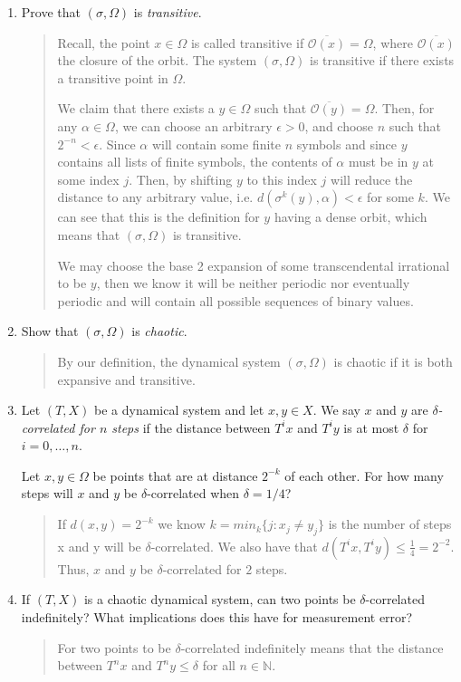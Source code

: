 \documentclass[letter]{article}
\newcommand{\N}{\mathbb{N}}
\begin{document}
\begin{enumerate}
\begin{enumerate}
			\item Prove that $(\sigma, \Omega)$ is \emph{transitive}.
			\begin{quote}
                Recall, the point $x \in \Omega$ is called transitive if $ \overline{ \mathcal O (x) } = \Omega$, where $\overline{ \mathcal O(x) }$ the closure of the orbit. The system $(\sigma, \Omega)$ is transitive if there exists a transitive point in $\Omega$. 
                
                We claim that there exists a $y\in \Omega$ such that $\overline{ \mathcal O (y) } = \Omega$.
			    Then, for any $\alpha \in \Omega$, we can choose an arbitrary $\epsilon > 0$, and choose $n$ such that $2^{-n} < \epsilon$. Since $\alpha$ will contain some finite $n$ symbols and since $y$ contains all lists of finite symbols, the contents of $\alpha$ must be in $y$ at some index $j$. Then, by shifting $y$ to this index $j$ will reduce the distance to any arbitrary value, i.e. $d(\sigma^k(y), \alpha) < \epsilon$ for some $k$. We can see that this is the definition for $y$ having a dense orbit, which means that $(\sigma, \Omega)$ is transitive.

                We may choose the base 2 expansion of some transcendental irrational to be $y$, then we know it will be neither periodic nor eventually periodic and will contain all possible sequences of binary values.
			\end{quote}
			
			\item Show that $(\sigma, \Omega)$ is \emph{chaotic}.
    			\begin{quote}
    			    By our definition, the dynamical system $(\sigma, \Omega)$ is chaotic if it is both expansive and transitive. 
    			\end{quote}
			\item Let $(T,X)$ be a dynamical system and let $x,y\in X$. We say $x$ and $y$ are
				\emph{$\delta$-correlated for $n$ steps} if the distance between $T^ix$ and $T^iy$ is
				at most $\delta$ for $i=0,\ldots, n$.

				Let $x,y\in \Omega$ be points that are at distance $2^{-k}$ of each other. For how many steps will
				$x$ and $y$ be $\delta$-correlated when $\delta=1/4$?
				\begin{quote}
				    If $d(x, y) = 2^{-k}$ we know $k = min_k\{j: x_j \neq y_j \}$ is the number of steps x and y will be $\delta$-correlated. We also have that $d(T^{i}x, T^{i}y) \leq \frac{1}{4} = 2^{-2}$. Thus, $x$ and $y$ be $\delta$-correlated for $2$ steps.
				\end{quote}
			\item If $(T,X)$ is a chaotic dynamical system, can two points be $\delta$-correlated indefinitely? What implications
				does this have for measurement error?
			\begin{quote}
			    For two points to be $\delta$-correlated indefinitely means that the distance between $T^nx$ and $T^ny \leq \delta$ for all $n \in \N$. 
			    

\end{quote}
\end{enumerate}
\end{enumerate}
\end{document}
